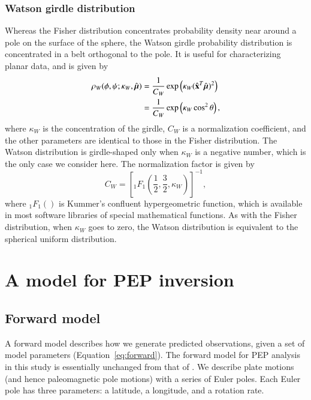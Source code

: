 \documentclass[preprint,12pt,authoryear]{elsarticle}
\newcommand{\mitbf}[1]{\hbox{\mathversion{bold}$#1$}}
\begin{document}
\subsubsection{Watson girdle distribution}
Whereas the Fisher distribution concentrates probability density near around a pole on
the surface of the sphere, the Watson girdle probability distribution is concentrated
in a belt orthogonal to the pole. It is useful for characterizing planar data, and is given by
\begin{equation}
  \begin{aligned}
  \rho_W(\phi, \psi; \kappa_W, \hat{\mitbf{\mu}}) 
  &= \frac{1}{C_W} \exp \left( \kappa_W (\hat{\mathbf{x}}^T \hat{\mitbf{\mu}})^2 \right) \\
  &= \frac{1}{C_W} \exp \left( \kappa_W \cos^2 \theta \right),
  \end{aligned}
\label{eq:watson}
\end{equation}
where $\kappa_W$ is the concentration of the girdle, $C_W$ is a normalization coefficient,
and the other parameters are identical to those in the Fisher distribution.
The Watson distribution is girdle-shaped only when $\kappa_W$ is a negative number, 
which is the only case we consider here.
The normalization factor is given by
\begin{equation}
  C_W = \left[ {}_1 F_1 \left( \frac{1}{2}, \frac{3}{2}, \kappa_W \right) \right]^{-1},
\end{equation}
where ${}_1 F_1()$ is Kummer's confluent hypergeometric function, which is available
in most software libraries of special mathematical functions.
As with the Fisher distribution, when $\kappa_W$ goes to zero, 
the Watson distribution is equivalent to the spherical uniform distribution.

\section{A model for PEP inversion}
\label{sec:model}
\subsection{Forward model}
\label{sec:forward_model}
A forward model describes how we generate predicted observations, given a set of model parameters (Equation~\eqref{eq:forward}).
The forward model for PEP analysis in this study is essentially unchanged from that of \citet{gordon1984paleomagnetic}.
We describe plate motions (and hence paleomagnetic pole motions) with a series of Euler poles.
Each Euler pole has three parameters: a latitude, a longitude, and a rotation rate.
\end{document}
